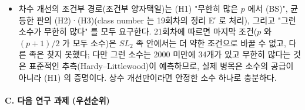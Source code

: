 \begin{itemize}
\item
  차수 개선의 조건부 경로(조건부 양자택일)는 (H1) "무한히 많은 \(p\) 에서 (BS)", 균등한 판의 (H2)·(H3)(class number 는 19회차의 정리 E′ 로 처리), 그리고 "그런 소수가 무한히 많다" 를 모두 요구한다. 21회차에 따르면 마지막 조건(\(p\) 와 \((p+1)/2\) 가 모두 소수)은 \(SL_2\) 족 안에서는 더 약한 조건으로 바꿀 수 없고, 다른 족은 찾지 못했다; 다만 그런 소수는 2000 미만에 34개가 있고 무한히 많다는 것은 표준적인 추측(Hardy--Littlewood)이 예측하므로, 실제 병목은 소수의 공급이 아니라 (H1) 의 증명이다. 상수 개선만이라면 안정한 소수 하나로 충분하다.
\end{itemize}

\hypertarget{c.-uxb2e4uxc74c-uxc5f0uxad6c-uxacfcuxc81c-uxc6b0uxc120uxc21cuxc704}{%
\paragraph{C. 다음 연구 과제 (우선순위)}\label{c.-uxb2e4uxc74c-uxc5f0uxad6c-uxacfcuxc81c-uxc6b0uxc120uxc21cuxc704}}

